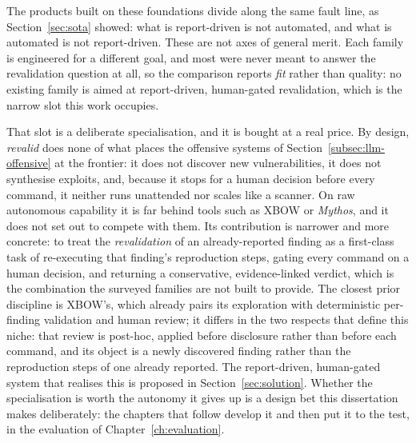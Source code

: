 The products built on these foundations divide along the same fault line, as
Section~\ref{sec:sota} showed: what is report-driven is not automated, and what is
automated is not report-driven. These are not axes of general merit. Each family is
engineered for a different goal, and most were never meant to answer the revalidation
question at all, so the comparison reports \emph{fit} rather than quality: no existing
family is aimed at report-driven, human-gated revalidation, which is the narrow slot
this work occupies.

That slot is a deliberate specialisation, and it is bought at a real price.
By design, \emph{revalid} does none of what places the offensive systems of
Section~\ref{subsec:llm-offensive} at the frontier: it does not discover new
vulnerabilities, it does not synthesise exploits, and, because it stops for a human
decision before every command, it neither runs unattended nor scales like a scanner.
On raw autonomous capability it is far behind tools such as XBOW or \emph{Mythos},
and it does not set out to compete with them. Its contribution is narrower and more
concrete: to treat the \emph{revalidation} of an already-reported finding as a
first-class task of re-executing that finding's reproduction steps, gating every
command on a human decision, and returning a conservative, evidence-linked verdict,
which is the combination the surveyed families are not built to provide. The closest
prior discipline is XBOW's, which already pairs its exploration with deterministic
per-finding validation and human review; it differs in the two respects that define
this niche: that review is post-hoc, applied before disclosure rather than before
each command, and its object is a newly discovered finding rather than the
reproduction steps of one already reported. The report-driven, human-gated system
that realises this is proposed in Section~\ref{sec:solution}. Whether the
specialisation is worth the autonomy it gives up is a design bet this dissertation
makes deliberately: the chapters that follow develop it and then put it to the test,
in the evaluation of Chapter~\ref{ch:evaluation}.
